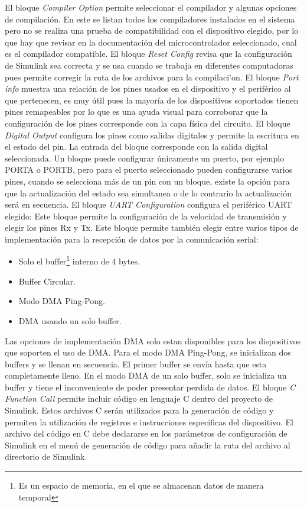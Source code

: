 El bloque \textit{Compiler Option} permite seleccionar el compilador y algunas opciones de compilaci\'{o}n. En este se listan todos los compiladores instalados en el sistema pero no se realiza una prueba de compatibilidad con el dispositivo elegido, por lo que hay que revisar en la documentaci\'{o}n del microcontrolador seleccionado, cual es el compilador compatible. El bloque \textit{Reset Config} revisa que la configuraci\'{o}n de Simulink sea correcta y se usa cuando se trabaja en diferentes computadoras pues permite corregir la ruta de los archivos para la compilaci'{o}n. El bloque \textit{Port info} muestra una relaci\'{o}n de los pines usados en el dispositivo y el perif\'{e}rico al que pertenecen, es muy \'{u}til pues la mayor\'{i}a de los dispositivos soportados tienen pines remapeables por lo que es una ayuda visual para corroborar que la configuraci\'{o}n de los pines corresponde con la capa f\'{i}sica del circuito. El bloque \textit{Digital Output} configura los pines como salidas digitales y permite la escritura en el estado del pin. La entrada del bloque corresponde con la salida digital seleccionada. Un bloque puede configurar \'{u}nicamente un puerto, por ejemplo PORTA o PORTB, pero para el puerto seleccionado pueden configurarse varios pines, cuando se selecciona m\'{a}s de un pin con un bloque, existe la opci\'{o}n para que la actualizaci\'{o}n del estado sea simultanea o de lo contrario la actualizaci\'{o}n ser\'{a} en secuencia. El bloque \textit{UART Configuration} configura el perif\'{e}rico UART elegido: Este bloque permite la configuraci\'{o}n de la velocidad de transmisi\'{o}n  y elegir los pines Rx y Tx. Este bloque permite tambi\'{e}n elegir entre varios tipos de implementaci\'{o}n para la recepci\'{o}n de datos por la comunicaci\'{o}n serial:

 
\begin{itemize}
    \item Solo el buffer\footnote{Es un espacio de memoria, en el que se almacenan datos de manera temporal} interno de 4 bytes.
    \item Buffer Circular.
    \item Modo DMA Ping-Pong.
    \item DMA usando un solo buffer.
\end{itemize}

Las opciones de implementaci\'{o}n DMA solo estan disponibles para los dispositivos que soporten el uso de DMA. Para el modo DMA Ping-Pong, se inicializan dos buffers y se llenan en secuencia. El primer buffer se env\'{i}a hasta que esta completamente lleno. En el modo DMA de un solo buffer, solo se inicializa un buffer y tiene el inconveniente de poder presentar perdida de datos. El bloque \textit{C Function Call} permite incluir c\'{o}digo en lenguaje C dentro del proyecto de Simulink. Estos archivos C ser\'{a}n utilizados para la generaci\'{o}n de c\'{o}digo y permiten la utilizaci\'{o}n de registros e instrucciones especificas del dispositivo. El archivo del c\'{o}digo en C debe declararse en los par\'{a}metros de configuraci\'{o}n de Simulink en el men\'{u} de generaci\'{o}n de c\'{o}digo para a\~{n}adir la ruta del archivo al directorio de Simulink.

